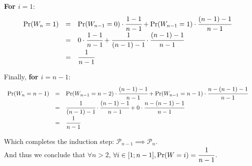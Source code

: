 \noindent
\textbf{For $i = 1$}:
\[\def\arraystretch{1.5}
  \begin{array}{lll}
    \Pr(W_n = 1) & = & \Pr(W_{n-1} = 0) \cdot \f{1 - 1}{n - 1} + \Pr(W_{n-1} = 1) \cdot \f{(n - 1) - 1}{n - 1} \\
                 & = & 0 \cdot \f{1 - 1}{n - 1} + \f{1}{(n - 1) - 1} \cdot \f{(n - 1) - 1}{n - 1} \\
                 & = & \f{1}{n - 1}
  \end{array}
\]

\noindent
Finally, \textbf{for $i = n-1$}:
\[\def\arraystretch{1.5}
  \begin{array}{lll}
    \Pr(W_n = n - 1) & = & \Pr(W_{n-1} = n - 2) \cdot \f{(n - 1) - 1}{n - 1} + \Pr(W_{n-1} = n-1) \cdot \f{n - (n-1) - 1}{n - 1} \\
                 & = & \f{1}{(n - 1) - 1} \cdot \f{(n - 1) - 1}{n - 1} + 0 \cdot \f{n - (n-1) - 1}{n - 1} \\
                 & = & \f{1}{n - 1}
  \end{array}
\]

\noindent
Which completes the induction step: $\mathcal{P}_{n-1} \implies \mathcal{P}_{n}$.\\

\noindent
And thus we conclude that $\forall n > 2$, $\forall i \in [1; n-1], \Pr(W = i) = \cfrac{1}{n - 1}$.
